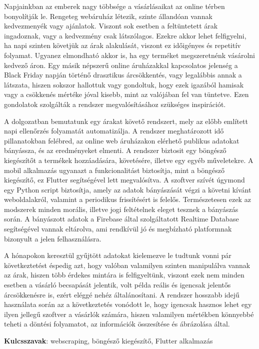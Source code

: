 Napjainkban az emberek nagy többsége a vásárlásaikat az online térben bonyolítják le. Rengeteg webáruház létezik, szinte állandóan vannak kedvezmenyék vagy ajánlatok. Viszont sok esetben a feltüntetett árak ingadoznak, vagy a kedvezmény csak látszólagos. Ezekre akkor lehet felfigyelni, ha napi szinten követjük az árak alakulását, viszont ez időigényes és repetitív folyamat. Ugyanez elmondható akkor is, ha egy terméket megszeretnénk vásárolni kedvező áron. Egy másik népszerű online áruházakkal kapcsolatos jelenség a Black Friday napján történő drasztikus árcsökkentés, vagy legalábbis annak a látszata, hiszen sokszor hallottuk vagy gondoltuk, hogy ezek igazából hamisak vagy a csökkenés mértéke jóval kisebb, mint az valójában fel van tüntetve. Ezen gondolatok szolgálták a rendszer megvalósításához szükséges inspirációt.

A dolgozatban bemutatunk egy árakat követő rendszert, mely az előbb említett napi ellenőrzés folyamatát automatizálja. A rendszer meghatározott idő pillanatokban felébred, az online web áruházakon elérhető publikus adatokat bányássza, és az eredményeket elmenti. A rendszer biztosit egy böngésző kiegészítőt a termékek hozzáadására, követésére, illetve egy egyéb műveletekre. A mobil alkalmazás ugyanazt a funkcionalitást biztosítja, mint a böngésző kiegészítő, ez Flutter segítségével lett megvalósítva. A szoftver szívét úgymond egy Python script biztosítja, amely az adatok bányászását végzi a követni kívánt weboldalakról, valamint a periodikus frissítésért is felelős. Természetesen ezek az modszerek minden morális, illetve jogi feltételnek eleget tesznek a bányászás során. A bányászott adatok a Firebase által szolgáltatott Realtime Database segítségével vannak eltárolva, ami rendkívül jó és megbízható platformnak bizonyult a jelen felhasználásra.

A hónapokon keresztül gyűjtött adatokat kielemezve le tudtunk vonni pár következtetést éspedig azt, hogy valóban valamilyen szinten manipulálva vannak az árak, hiszen több érdekes mintára is felfigyeltünk, viszont ezek nem minden esetben a vásárló becsapását jelentik, volt példa reális és igencsak jelentős árcsökkenésre is, ezért eléggé nehéz általánosítani. A rendszer hosszabb idejű használata során az a következtetés vonódott le, hogy igencsak hasznos lehet egy ilyen jellegű szoftver a vásárlók számára, hiszen valamilyen mértékben könnyebbé teheti a döntési folyamatot, az információk összesítése és ábrázolása által.

\textbf{Kulcsszavak}: webscraping, böngésző kiegészítő, Flutter alkalmazás
